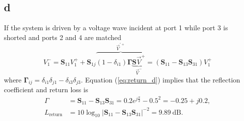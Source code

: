 \documentclass{article}
\begin{document}
\subsection{d}\label{sec:1d}
If the system is driven by a voltage wave incident at port 1 while port 3 is shorted and ports 2 and 4 are matched
\begin{equation}
  V^{-}_{1}=\mathbf{S}_{11}V^{+}_{1} + \mathbf{S}_{1j}\overbrace{(1-\delta_{i1})\mathbf{\Gamma}\underbrace{\mathbf{S}\vec{V}^{+}}_{\vec{V}^{-}}}^{\vec{V}^{'+}}=(\mathbf{S}_{11}-\mathbf{S}_{13}\mathbf{S}_{31})V^{+}_{1}
  \label{eq:return_d}
\end{equation}
where $\mathbf{\Gamma}_{ij}=\delta_{i1}\delta_{j1}-\delta_{i3}\delta_{j3}$. Equation (\ref{eq:return_d}) implies that the reflection coefficient and return loss is
\begin{subequations}
  \begin{align}
    \Gamma & = \mathbf{S}_{11}-\mathbf{S}_{13}\mathbf{S}_{31}=0.2e^{j\frac{\pi}{2}}-0.5^2=-0.25+j0.2, \\
    L_\text{return} & = 10\log_{10}|\mathbf{S}_{11}-\mathbf{S}_{13}\mathbf{S}_{31}|^{-2}=\SI{9.89}{\deci\bel}.
  \end{align}
  \label{eq:RL}
\end{subequations}
\end{document}
